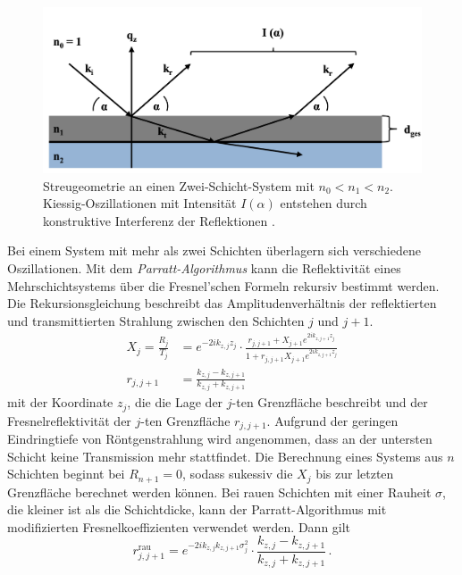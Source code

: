 \begin{figure}
    \centering
    \includegraphics[width = \linewidth]{schichtdicke.png}
    \caption{Streugeometrie an einen Zwei-Schicht-System mit $n_0 < n_1 < n_2$. Kiessig-Oszillationen 
    mit Intensität $I(\alpha)$ entstehen durch konstruktive Interferenz der Reflektionen \cite{dissertation}.}
    \label{fig:schichtdicke}
\end{figure}
Bei einem System mit mehr als zwei Schichten überlagern sich verschiedene Oszillationen. Mit dem \textit{Parratt-Algorithmus}
kann die Reflektivität eines Mehrschichtsystems über die Fresnel'schen Formeln rekursiv bestimmt werden.
Die Rekursionsgleichung beschreibt das Amplitudenverhältnis der reflektierten und transmittierten Strahlung
zwischen den Schichten $j$ und $j+1$. 
\begin{align}
    X_j = \frac{R_j}{T_j} &= e^{-2 i k_{z,j}z_j} \cdot \frac{r_{j, j+1} + X_{j+1}e^{2 i k_{z,j+1}z_j}}{1+r_{j, j+1}  X_{j+1}e^{2 i k_{z,j+1}z_j}} \\
    r_{j, j+1} &= \frac{k_{z,j}-k_{z, j+1}}{k_{z,j}+k_{z, j+1}}
\end{align}
mit der Koordinate $z_j$, die die Lage der $j$-ten Grenzfläche beschreibt und der Fresnelreflektivität
der $j$-ten Grenzfläche $r_{j, j+1}$.
Aufgrund der geringen Eindringtiefe von Röntgenstrahlung wird angenommen, dass an der untersten Schicht 
keine Transmission mehr stattfindet.
Die Berechnung eines Systems aus $n$ Schichten beginnt bei $R_{n+1} = 0$, sodass sukessiv die $X_j$ bis zur 
letzten Grenzfläche berechnet werden können. 
Bei rauen Schichten mit einer Rauheit $\sigma$, die kleiner ist als die Schichtdicke, kann der Parratt-Algorithmus
mit modifizierten Fresnelkoeffizienten verwendet werden. Dann gilt \cite{dissertation}
\begin{equation}
    r_{j, j+1}^\text{rau} = e^{-2 i k_{z,j} k_{z, j+1} \sigma_j^2} \cdot \frac{k_{z,j}-k_{z, j+1}}{k_{z,j}+k_{z, j+1}} \, .
\end{equation}

